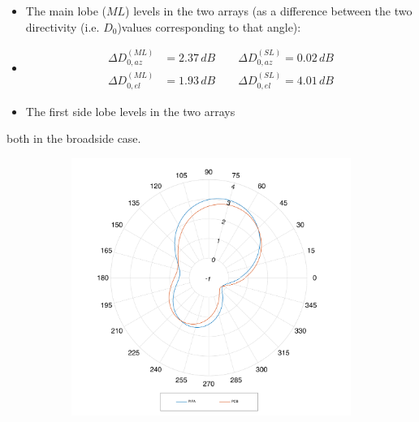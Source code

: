 \documentclass[12pt,a4paper]{article}
\begin{document}
{\begin{itemize}
		\begin{itemize}
			\item The main lobe ($ML$) levels in the two arrays (as a difference between the two directivity (i.e. $D_0$)values corresponding to that angle): 
			\item 
			\begin{equation}
				\begin{aligned}
					\Delta D_{0,az}^{(ML)} &= 2.37\,dB\qquad \Delta D_{0,az}^{(SL)} = 0.02\,dB\\
					\Delta D_{0,el}^{(ML)} &= 1.93\,dB\qquad \Delta D_{0,el}^{(SL)} = 4.01\,dB
				\end{aligned}
			\end{equation}
			\item The first side lobe levels in the two arrays
		\end{itemize}
		both in the broadside case. 
	\end{itemize}
	\begin{figure}[h]
		\begin{center}
			\begin{subfigure}{0.5\linewidth}
				\includegraphics[scale=0.3]{pifa_pcb_null_azymuth_comparison.pdf}
				\caption{}
			\end{subfigure}
			\begin{subfigure}{0.5\linewidth}

\end{subfigure}
\end{center}
\end{figure}}
\end{document}
